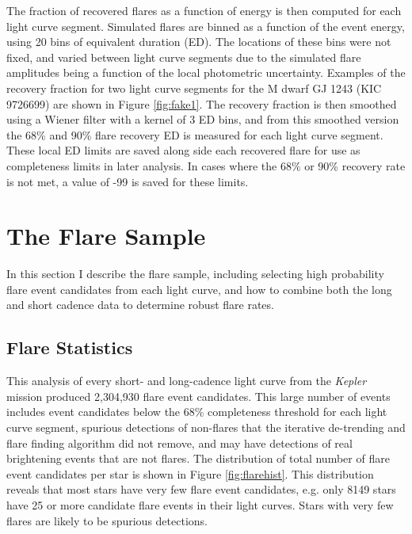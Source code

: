 \documentclass[twocolumn]{aastex6}
\newcommand{\Kepler}{\textsl{Kepler}\xspace}
\begin{document}
The fraction of recovered flares as a function of energy is then computed for each light curve segment. 
Simulated flares are binned as a function of the event energy, using 20 bins of equivalent duration (ED). The locations of these bins were not fixed, and varied between light curve segments due to the simulated flare amplitudes being a function of the local photometric uncertainty. Examples of the recovery fraction for two light curve segments for the M dwarf GJ 1243 (KIC 9726699) are shown in Figure \ref{fig:fake1}. The recovery fraction is then smoothed using a Wiener filter with a kernel of 3 ED bins, and from this smoothed version the 68\% and 90\% flare recovery ED is measured for each light curve segment. These local ED limits are saved along side each recovered flare for use as completeness limits in later analysis. In cases where the 68\% or 90\% recovery rate is not met, a value of -99 is saved for these limits.





\section{The Flare Sample}
In this section I describe the flare sample, including selecting high probability flare event candidates from each light curve, and how to combine both the long and short cadence data to determine robust flare rates.


\subsection{Flare Statistics}


This analysis of every short- and long-cadence light curve from the \Kepler mission produced 2,304,930 flare event candidates. This large number of events includes event candidates below the 68\% completeness threshold for each light curve segment, spurious detections of non-flares that the iterative de-trending and flare finding algorithm did not remove, and may have detections of real brightening events that are not flares. The distribution of total number of flare event candidates per star is shown in Figure \ref{fig:flarehist}. This distribution reveals that most stars have very few flare event candidates, e.g. only 8149 stars have 25 or more candidate flare events in their light curves. Stars with very few flares are likely to be spurious detections.
\end{document}
